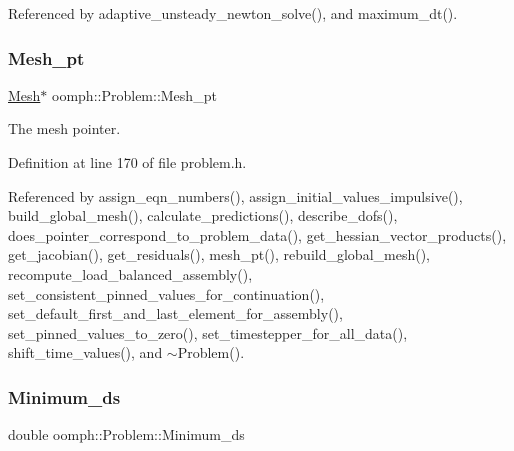 Referenced by adaptive\+\_\+unsteady\+\_\+newton\+\_\+solve(), and maximum\+\_\+dt().

\mbox{\label{classoomph_1_1Problem_aa4a3bf9419e495aaaaea0dcb00ea53e5}} 
\subsubsection{\texorpdfstring{Mesh\+\_\+pt}{Mesh\_pt}}
{\footnotesize\ttfamily \hyperlink{classoomph_1_1Mesh}{Mesh}$\ast$ oomph\+::\+Problem\+::\+Mesh\+\_\+pt\hspace{0.3cm}{\ttfamily [private]}}



The mesh pointer. 



Definition at line 170 of file problem.\+h.



Referenced by assign\+\_\+eqn\+\_\+numbers(), assign\+\_\+initial\+\_\+values\+\_\+impulsive(), build\+\_\+global\+\_\+mesh(), calculate\+\_\+predictions(), describe\+\_\+dofs(), does\+\_\+pointer\+\_\+correspond\+\_\+to\+\_\+problem\+\_\+data(), get\+\_\+hessian\+\_\+vector\+\_\+products(), get\+\_\+jacobian(), get\+\_\+residuals(), mesh\+\_\+pt(), rebuild\+\_\+global\+\_\+mesh(), recompute\+\_\+load\+\_\+balanced\+\_\+assembly(), set\+\_\+consistent\+\_\+pinned\+\_\+values\+\_\+for\+\_\+continuation(), set\+\_\+default\+\_\+first\+\_\+and\+\_\+last\+\_\+element\+\_\+for\+\_\+assembly(), set\+\_\+pinned\+\_\+values\+\_\+to\+\_\+zero(), set\+\_\+timestepper\+\_\+for\+\_\+all\+\_\+data(), shift\+\_\+time\+\_\+values(), and $\sim$\+Problem().

\mbox{\label{classoomph_1_1Problem_ad0f8bb126a4f5ddeb559c23a8d451d8d}} 
\subsubsection{\texorpdfstring{Minimum\+\_\+ds}{Minimum\_ds}}
{\footnotesize\ttfamily double oomph\+::\+Problem\+::\+Minimum\+\_\+ds\hspace{0.3cm}{\ttfamily [protected]}}



